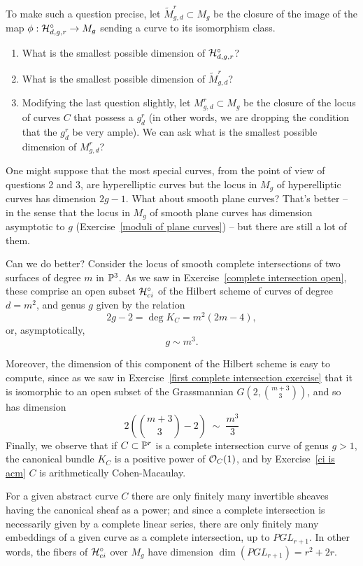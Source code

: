 To make such a question precise, let $\widetilde M^r_{g,d} \subset M_g$ be the closure of the image of the map $\phi : \cH^\circ_{d,g,r}\to M_g$ sending a curve to its isomorphism class. 
\begin{enumerate}
\item What is the smallest possible dimension of $\cH^\circ_{d,g,r}$? 
\item What is the smallest possible dimension of $\widetilde M^r_{g,d}$?
\item Modifying the last question slightly, let $M^r_{g,d} \subset M_g$ be the closure of the locus of curves $C$ that possess a $g^r_d$ (in other words, we are dropping the condition that the $g^r_d$ be very ample). We can ask what is the smallest possible dimension of $M^r_{g,d}$?
\end{enumerate}

One might suppose that the most special curves, from the point of view of questions 2 and 3, are hyperelliptic curves but the locus in $M_g$ of hyperelliptic curves has dimension $2g-1$. What about smooth plane curves? That's better -- in the sense that the locus in $M_g$ of smooth plane curves has dimension asymptotic to $g$ (Exercise~\ref{moduli of plane curves}) -- but there are still a lot of them.


Can we do better?  Consider the locus of smooth complete intersections of two surfaces of degree $m$ in $\PP^3$. As we saw in Exercise~\ref{complete intersection open}, these comprise an open subset $\cH^\circ_{ci}$ of the Hilbert scheme of curves of degree $d = m^2$, and genus $g$ given by the relation
$$
2g-2 = \deg K_C = m^2(2m-4),
$$
or, asymptotically,
$$
g \sim m^3.
$$

Moreover, the dimension of this component of the Hilbert scheme is easy to compute, since as we saw in Exercise~\ref{first complete intersection exercise} that it is isomorphic to an open subset of the Grassmannian $G(2, \binom{m+3}{3})$, and so has dimension
$$
2(\binom{m+3}{3} - 2) \; \sim \; \frac{m^3}{3}
$$
Finally, we observe that if $C \subset \PP^r$ is a complete intersection curve of genus $g >1$, the canonical bundle $K_C$ is a positive power of $\cO_C(1)$, and by Exercise~\ref{ci is acm}  $C$ is arithmetically Cohen-Macaulay.

 
For a given abstract curve $C$ there are only finitely many invertible sheaves having the canonical sheaf as a power; and since a complete intersection is necessarily given by a complete linear series, there are only finitely many embeddings of a given curve as a complete intersection, up to $PGL_{r+1}$. In other words, the fibers of $\cH^\circ_{ci}$ over $M_g$ have dimension $\dim(PGL_{r+1}) = r^2 + 2r$.

